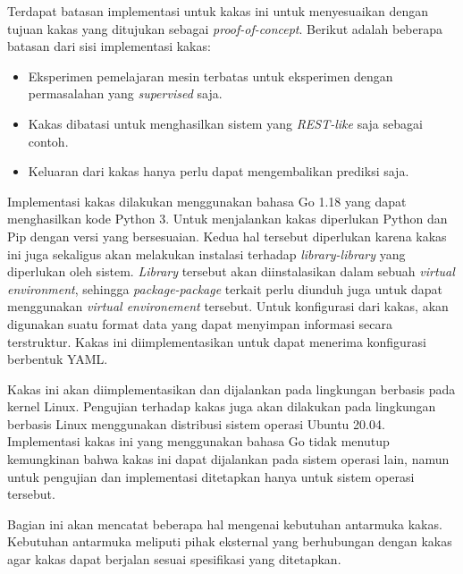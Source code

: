 
Terdapat batasan implementasi untuk kakas ini untuk menyesuaikan dengan tujuan kakas yang ditujukan sebagai \textit{proof-of-concept}.
Berikut adalah beberapa batasan dari sisi implementasi kakas:

\begin{itemize}
    \item Eksperimen pemelajaran mesin terbatas untuk eksperimen dengan permasalahan yang \textit{supervised} saja.
    \item Kakas dibatasi untuk menghasilkan sistem yang \textit{REST-like} saja sebagai contoh.
    \item Keluaran dari kakas hanya perlu dapat mengembalikan prediksi saja.
\end{itemize}


Implementasi kakas dilakukan menggunakan bahasa Go 1.18 yang dapat menghasilkan kode Python 3.
Untuk menjalankan kakas diperlukan Python dan Pip dengan versi yang bersesuaian.
Kedua hal tersebut diperlukan karena kakas ini juga sekaligus akan melakukan instalasi terhadap \textit{library-library} yang diperlukan oleh sistem.
\textit{Library} tersebut akan diinstalasikan dalam sebuah \textit{virtual environment}, sehingga \textit{package-package} terkait perlu diunduh juga untuk dapat menggunakan \textit{virtual environement} tersebut.
Untuk konfigurasi dari kakas, akan digunakan suatu format data yang dapat menyimpan informasi secara terstruktur.
Kakas ini diimplementasikan untuk dapat menerima konfigurasi berbentuk YAML.

Kakas ini akan diimplementasikan dan dijalankan pada lingkungan berbasis pada kernel Linux.
Pengujian terhadap kakas juga akan dilakukan pada lingkungan berbasis Linux menggunakan distribusi sistem operasi Ubuntu 20.04.
Implementasi kakas ini yang menggunakan bahasa Go tidak menutup kemungkinan bahwa kakas ini dapat dijalankan pada sistem operasi lain, namun untuk pengujian dan implementasi ditetapkan hanya untuk sistem operasi tersebut.



Bagian ini akan mencatat beberapa hal mengenai kebutuhan antarmuka kakas.
Kebutuhan antarmuka meliputi pihak eksternal yang berhubungan dengan kakas agar kakas dapat berjalan sesuai spesifikasi yang ditetapkan.

